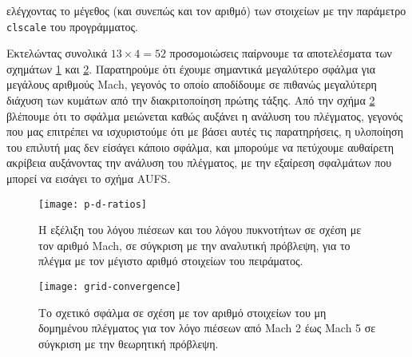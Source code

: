 ελέγχοντας το μέγεθος (και συνεπώς και τον αριθμό) των στοιχείων με την παράμετρο \texttt{clscale} του προγράμματος.

Εκτελώντας συνολικά $13 \times 4 = 52$ προσομοιώσεις παίρνουμε τα αποτελέσματα των σχημάτων \ref{fig:p-d-ratios} και \ref{fig:grid-conv}.
Παρατηρούμε ότι έχουμε σημαντικά μεγαλύτερο σφάλμα για μεγάλους αριθμούς Mach, γεγονός το οποίο αποδίδουμε σε πιθανώς μεγαλύτερη διάχυση των κυμάτων από την διακριτοποίηση πρώτης τάξης.
Από την σχήμα \ref{fig:grid-conv} βλέπουμε ότι το σφάλμα μειώνεται καθώς αυξάνει η ανάλυση του πλέγματος, γεγονός που μας επιτρέπει να ισχυριστούμε ότι με βάσει αυτές τις παρατηρήσεις, η υλοποίηση του επιλυτή μας δεν είσάγει κάποιο σφάλμα, και μπορούμε να πετύχουμε αυθαίρετη ακρίβεια αυξάνοντας την ανάλυση του πλέγματος, με την εξαίρεση σφαλμάτων που μπορεί να εισάγει το σχήμα AUFS.

\begin{figure}
    \centering
    \texttt{[image: p-d-ratios]}
    \caption{Η εξέλιξη του λόγου πιέσεων και του λόγου πυκνοτήτων σε σχέση με τον αριθμό Mach, σε σύγκριση με την αναλυτική πρόβλεψη, για το πλέγμα με τον μέγιστο αριθμό στοιχείων του πειράματος.}
    \label{fig:p-d-ratios}
\end{figure}

\begin{figure}
    \centering
    \texttt{[image: grid-convergence]}
    \caption{Το σχετικό σφάλμα σε σχέση με τον αριθμό στοιχείων του μη δομημένου πλέγματος για τον λόγο πιέσεων από Mach 2 έως Mach 5 σε σύγκριση με την θεωρητική πρόβλεψη.}
    \label{fig:grid-conv}
\end{figure}


% 
% 
% 
% 

